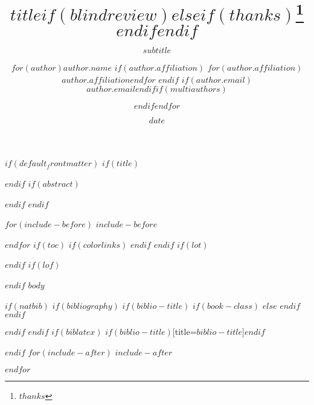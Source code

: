 \documentclass[$if(numbers)$numbers=$numbers$,$endif$$if(fontsize)$$fontsize$,$endif$$if(lang)$$babel-lang$,$endif$$if(papersize)$$papersize$paper,$endif$$for(classoption)$$classoption$$sep$,$endfor$]{$documentclass$}
\title{$title$$if(blindreview)$$else$$if(thanks)$\thanks{$thanks$}$endif$$endif$}
\subtitle{$subtitle$}
\author{
    $for(author)$$author.name$
    $if(author.affiliation)$
    $for(author.affiliation)$\\ \normalsize\textit{$author.affiliation$}\vspace{-3ex}$endfor$
    $endif$
    $if(author.email)$\\ \normalsize\texttt{$author.email$}$endif$$if(multiauthors)$ \and $endif$$endfor$
  }
\date{$date$}
\begin{document}
$if(default_frontmatter)$
$if(title)$
\maketitle
$endif$
$if(abstract)$
$endif$
$endif$

\newpage

$for(include-before)$
$include-before$

$endfor$
$if(toc)$
{
$if(colorlinks)$
\hypersetup{linkcolor=$if(toccolor)$$toccolor$$else$black$endif$}
$endif$
\setcounter{tocdepth}{$toc-depth$}
\tableofcontents
}
$endif$
$if(lot)$
\listoftables
$endif$
$if(lof)$
\listoffigures
$endif$
$body$

$if(natbib)$
$if(bibliography)$
$if(biblio-title)$
$if(book-class)$
\renewcommand\bibname{$biblio-title$}
$else$
\renewcommand\refname{$biblio-title$}
$endif$
$endif$


$endif$
$endif$
$if(biblatex)$
\printbibliography$if(biblio-title)$[title=$biblio-title$]$endif$

$endif$
$for(include-after)$
$include-after$

$endfor$
\end{document}
